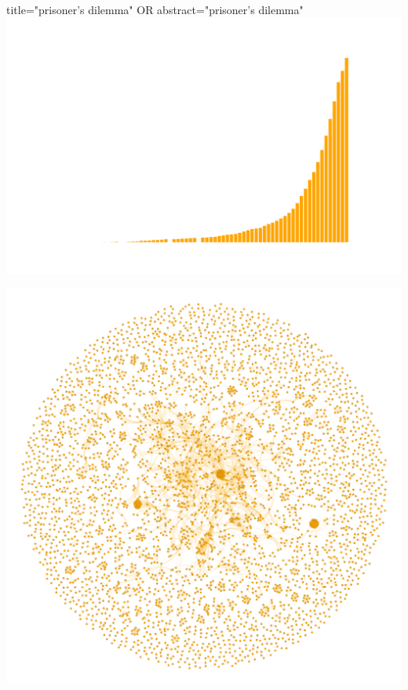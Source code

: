 \documentclass{beamer}
\begin{document}
\begin{frame}
    \begin{center}
    \small{title="prisoner's dilemma" OR abstract="prisoner's dilemma"}\\
    
    \vspace{-.50cm}
    \includegraphics[width=\textwidth]{static/articles.png}
    \end{center}
\end{frame}

\begin{frame}
    \begin{center}
    
    \end{center}
\end{frame}

\begin{frame}
    \begin{center}
    
    \end{center}
\end{frame}

\begin{frame}
    \begin{center}
        \includegraphics[width=.7\textwidth]{static/pd.png}
    \end{center}
\end{frame}
\end{document}
